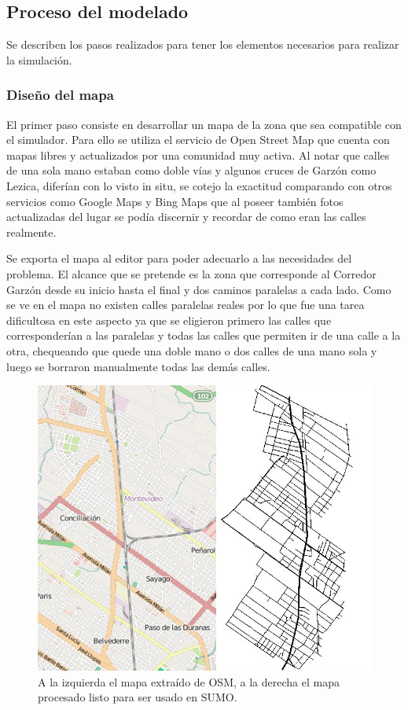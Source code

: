 \subsection{Proceso del modelado}

Se describen los pasos realizados para tener los elementos necesarios para realizar la simulación.

\subsubsection{Diseño del mapa}

El primer paso consiste en desarrollar un mapa de la zona que sea compatible con el simulador. Para ello se utiliza el servicio de Open Street Map \citep{OSM} que cuenta con mapas libres y actualizados por una comunidad muy activa. Al notar que calles de una sola mano estaban como doble vías y algunos cruces de Garzón como Lezica, diferían con lo visto in situ, se cotejo la exactitud comparando con otros servicios como Google Maps y Bing Maps que al poseer también fotos actualizadas del lugar se podía discernir y recordar de como eran las calles realmente.

Se exporta el mapa al editor \citet{JOSM} para poder adecuarlo a las necesidades del problema. El alcance que se pretende es la zona que corresponde al Corredor Garzón desde su inicio hasta el final y dos caminos paralelas a cada lado. Como se ve en el mapa no existen calles paralelas reales por lo que fue una tarea dificultosa en este aspecto ya que se eligieron primero las calles que corresponderían a las paralelas y todas las calles que permiten ir de una calle a la otra, chequeando que quede una doble mano o dos calles de una mano sola y luego se borraron manualmente todas las demás calles.

\begin{figure}[H]
	\centering
	\includegraphics[width=0.9\linewidth]{Figures/mapa_osm_sumo}
	\caption{A la izquierda el mapa extraído de OSM, a la derecha el mapa procesado listo para ser usado en SUMO.}
	\label{fig:mapa_osm_sumo}
\end{figure}

